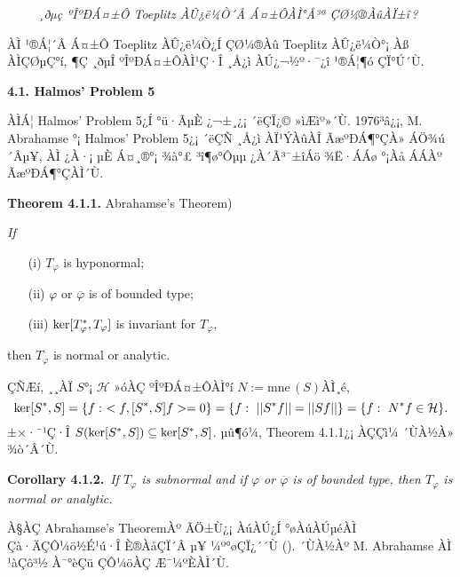 \documentclass[12pt,a4paper,2sided]{article}
\begin{document}
\vspace{.2 cm}\label{4.1.1}\ \ \ \ \ {\it ¸ðµç ºÎºÐÁ¤±Ô Toeplitz
ÀÛ¿ë¼Ò´Â Á¤±ÔÀÌ°Å³ª ÇØ¼®ÀûÀÏ±î\,?}

\vspace{.2 cm}  ÀÌ ¹®Á¦´Â Á¤±Ô Toeplitz ÀÛ¿ë¼Ò¿Í ÇØ¼®Àû Toeplitz
ÀÛ¿ë¼Ò°¡ Àß ÀÌÇØµÇ°í, ¶Ç ¸ðµÎ ºÎºÐÁ¤±ÔÀÌ¹Ç·Î ¸Å¿ì ÀÚ¿¬½º·¯¿î ¹®Á¦¶ó
ÇÏ°Ú´Ù.

\vspace{.2 cm}

\newpage{}


\vspace{.8 cm}

{\bf 4.1. Halmos' Problem 5}

\vspace{0.3cm} ÀÌÁ¦ Halmos' Problem 5¿Í °ü·ÃµÈ ¿¬±¸¿¡ ´ëÇÏ¿©
»ìÆìº»´Ù. 1976³â¿¡, M. Abrahamse \cite{Ab}°¡ Halmos' Problem 5¿¡
´ëÇÑ ¸Å¿ì ÀÏ¹ÝÀûÀÎ ÃæºÐÁ¶°ÇÀ» ÁÖ¾ú´Âµ¥, ÀÌ ¿À·¡ µÈ Á¤¸®°¡ ¾à°£
³î¶ø°Ôµµ ¿À´Ã³¯±îÁö ¾Ë·ÁÁø °¡Àå ÁÁÀº ÃæºÐÁ¶°ÇÀÌ´Ù.

\vspace{0.3cm} {\bf Theorem 4.1.1.} Abrahamse's Theorem) {\rm
\cite{Ab}} {\sl If
\begin{itemize}
\item[{\rm (i)}] $T_{\varphi}$ is hyponormal;
\item[{\rm (ii)}] $\varphi$ or $\overline\varphi$ is of bounded type;
\item[{\rm (iii)}] ${\rm ker}[T_{\varphi}^*,T_{\varphi}]$ is invariant for $T_{\varphi}$,
\end{itemize}
then $T_{\varphi}$ is normal or analytic.}

\vspace{0.3cm} ÇÑÆí, ¸¸ÀÏ $S$°¡ $\mathcal H$ »óÀÇ ºÎºÐÁ¤±ÔÀÌ°í
$N:=\mbox{mne}\,(S)$ÀÌ¸é,
$$
{\rm ker}[S^*,S]=\{ f:\ <f, [S^*,S]f>=0\}=\{ f:\ ||S^*f||=||Sf||\}=\{ f:\ N^{*}f\in\mathcal{H}\}.
$$
±×·¯¹Ç·Î $S({\rm ker}[S^*,S])\subseteq {\rm ker}[S^*,S]$. µû¶ó¼­,
Theorem 4.1.1¿¡ ÀÇÇì¼­ ´ÙÀ½À» ¾ò´Â´Ù.

\vspace{0.3cm} {\bf Corollary 4.1.2.}\ {\sl If $T_{\varphi}$ is
subnormal and if $\varphi$ or $\overline\varphi$ is of bounded type,
then $T_{\varphi}$ is normal or analytic.} \vspace{0.3cm}

À§ÀÇ Abrahamse's TheoremÀº ÃÖ±Ù¿¡ ÀúÀÚ¿Í °øÀúÀÚµéÀÌ Çà·ÄÇÔ¼ö½É¹ú·Î
È®ÀåÇÏ´Â µ¥ ¼º°øÇÏ¿´´Ù (\cite{CHL2}). ´ÙÀ½Àº M. Abrahamse
\cite{Ab}ÀÌ  ¹àÇô³½ À¯°èÇü ÇÔ¼öÀÇ Æ¯¼ºÈ­ÀÌ´Ù.
\end{document}
